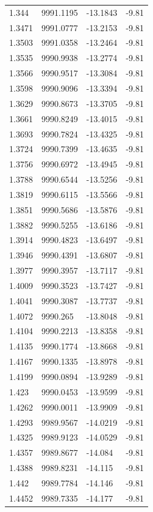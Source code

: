 \begin{table}[H]
\begin{tabular}{llll}
1.344 & 9991.1195 & -13.1843 & -9.81 \\
1.3471 & 9991.0777 & -13.2153 & -9.81 \\
1.3503 & 9991.0358 & -13.2464 & -9.81 \\
1.3535 & 9990.9938 & -13.2774 & -9.81 \\
1.3566 & 9990.9517 & -13.3084 & -9.81 \\
1.3598 & 9990.9096 & -13.3394 & -9.81 \\
1.3629 & 9990.8673 & -13.3705 & -9.81 \\
1.3661 & 9990.8249 & -13.4015 & -9.81 \\
1.3693 & 9990.7824 & -13.4325 & -9.81 \\
1.3724 & 9990.7399 & -13.4635 & -9.81 \\
1.3756 & 9990.6972 & -13.4945 & -9.81 \\
1.3788 & 9990.6544 & -13.5256 & -9.81 \\
1.3819 & 9990.6115 & -13.5566 & -9.81 \\
1.3851 & 9990.5686 & -13.5876 & -9.81 \\
1.3882 & 9990.5255 & -13.6186 & -9.81 \\
1.3914 & 9990.4823 & -13.6497 & -9.81 \\
1.3946 & 9990.4391 & -13.6807 & -9.81 \\
1.3977 & 9990.3957 & -13.7117 & -9.81 \\
1.4009 & 9990.3523 & -13.7427 & -9.81 \\
1.4041 & 9990.3087 & -13.7737 & -9.81 \\
1.4072 & 9990.265 & -13.8048 & -9.81 \\
1.4104 & 9990.2213 & -13.8358 & -9.81 \\
1.4135 & 9990.1774 & -13.8668 & -9.81 \\
1.4167 & 9990.1335 & -13.8978 & -9.81 \\
1.4199 & 9990.0894 & -13.9289 & -9.81 \\
1.423 & 9990.0453 & -13.9599 & -9.81 \\
1.4262 & 9990.0011 & -13.9909 & -9.81 \\
1.4293 & 9989.9567 & -14.0219 & -9.81 \\
1.4325 & 9989.9123 & -14.0529 & -9.81 \\
1.4357 & 9989.8677 & -14.084 & -9.81 \\
1.4388 & 9989.8231 & -14.115 & -9.81 \\
1.442 & 9989.7784 & -14.146 & -9.81 \\
1.4452 & 9989.7335 & -14.177 & -9.81 \\

\end{tabular}
\end{table}
